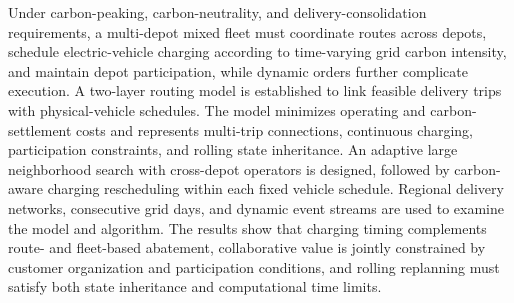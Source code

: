 Under carbon-peaking, carbon-neutrality, and delivery-consolidation requirements, a multi-depot mixed fleet must coordinate routes across depots, schedule electric-vehicle charging according to time-varying grid carbon intensity, and maintain depot participation, while dynamic orders further complicate execution. A two-layer routing model is established to link feasible delivery trips with physical-vehicle schedules. The model minimizes operating and carbon-settlement costs and represents multi-trip connections, continuous charging, participation constraints, and rolling state inheritance. An adaptive large neighborhood search with cross-depot operators is designed, followed by carbon-aware charging rescheduling within each fixed vehicle schedule. Regional delivery networks, consecutive grid days, and dynamic event streams are used to examine the model and algorithm. The results show that charging timing complements route- and fleet-based abatement, collaborative value is jointly constrained by customer organization and participation conditions, and rolling replanning must satisfy both state inheritance and computational time limits.
